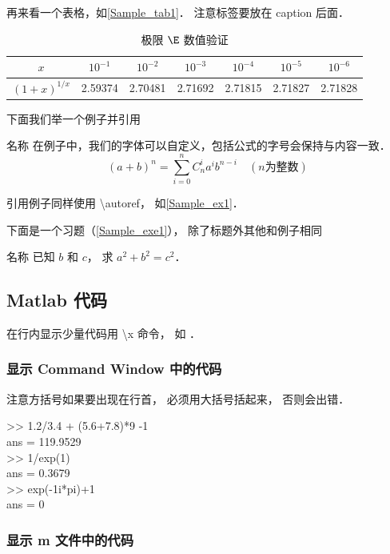 再来看一个表格，如\autoref{Sample_tab1}． 注意标签要放在 caption 后面．
\begin{table}[ht]
\centering
\caption{极限 $\E$ 数值验证}\label{Sample_tab1}
\begin{tabular}{|c|c|c|c|c|c|c|}
\hline
$x$ & ${10^{ - 1}}$ & ${10^{ - 2}}$ & ${10^{ - 3}}$ & ${10^{ - 4}}$ & ${10^{ - 5}}$ & ${10^{ - 6}}$ \\
\hline
$(1 + x)^{1/x}$ & 2.59374 & 2.70481 & 2.71692 & 2.71815 & 2.71827 & 2.71828 \\
\hline
\end{tabular}
\end{table}

下面我们举一个例子并引用

\begin{exam}{名称}\label{Sample_ex1}
在例子中，我们的字体可以自定义，包括公式的字号会保持与内容一致．
\begin{equation}
(a+b)^n = \sum_{i=0}^n C_n^i a^i b^{n-i} \quad (n\text{为整数})
\end{equation}
\end{exam}
引用例子同样使用 \textbackslash autoref， 如\autoref{Sample_ex1}． 

下面是一个习题（\autoref{Sample_exe1}）， 除了标题外其他和例子相同
\begin{exer}{名称}\label{Sample_exe1}
已知 $b$ 和 $c$， 求 $a^2 + b^2 = c^2$．
\end{exer}

\subsection{Matlab 代码}
在行内显示少量代码用 \textbackslash x 命令， 如 ．
\subsubsection{显示  Command Window 中的代码}
注意方括号如果要出现在行首， 必须用大括号括起来， 否则会出错．
\begin{Command}
>> 1.2/3.4 + (5.6+7.8)*9 -1 \\
ans = 119.9529 \\
>> 1/exp(1) \\
ans = 0.3679 \\
>> exp(-1i*pi)+1 \\
ans = 0
\end{Command}

\subsubsection{显示 m 文件中的代码}

